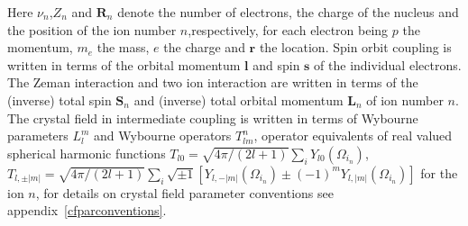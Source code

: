 \documentclass[twoside]{article}
\newcommand{\mbf}[1]{\mathbf #1}
\begin{document}
Here $\nu_n$,$Z_n$ and $\mbf R_n$ denote the number of electrons, the charge of the nucleus
and the position
 of the ion number $n$,respectively, for each electron being
$p$ the momentum, $m_e$ the mass, $e$ the charge and $\mbf r$ the location.
Spin orbit coupling is written in terms of the orbital momentum $\mbf l$ and
spin $\mbf s$ of the individual electrons. The
 Zeman interaction and two ion interaction are written in terms of 
the (inverse) total spin $\mbf S_n$ and (inverse) total orbital momentum $\mbf L_n$
of ion number $n$. The crystal field in intermediate coupling is written
in terms of Wybourne parameters $L_l^m$ and Wybourne operators $T_{lm}^n$, operator equivalents
of real valued 
spherical harmonic functions 
$T_{l0}=\sqrt{4\pi/(2l+1)}\sum_iY_{l0}(\Omega_{i_n})$, 
$T_{l,\pm|m|}=\sqrt{4\pi/(2l+1)}\sum_i \sqrt{\pm1}[Y_{l,-|m|}(\Omega_{i_n})\pm (-1)^m Y_{l,|m|}(\Omega_{i_n})]$ for the ion $n$,
for details on crystal field parameter 
conventions see appendix~\ref{cfparconventions}.

\clearpage



\clearpage



\clearpage



\clearpage



\clearpage



\clearpage






\clearpage





\clearpage



\clearpage



\clearpage		     

\appendix






\clearpage


\clearpage



\end{document}

